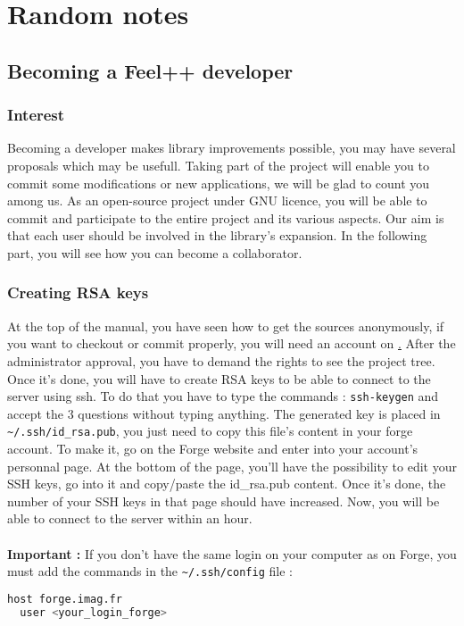 \chapter{Random notes}
\label{cha:random-notes}

\section{Becoming a Feel++ developer}
\label{feeldevel}
\subsection{Interest}
Becoming a \feel developer makes library improvements possible, you may have several proposals which may be usefull. Taking part of the project will enable you to commit some modifications or new applications, we will be glad to count you among us. As an open-source project under GNU licence,  you will be able to commit and participate to the entire project and its various aspects. Our aim is that each user should be involved in the library's expansion. In the following part, you will see how you can become a \feel collaborator.

\subsection{Creating RSA keys}
\label{sec:creation-rsa-keys}
At the top of the manual, you have seen how to get the sources anonymously, if you want to checkout or commit properly, you will need an account on \href{https://forge.imag.fr/}. After the administrator approval, you have to demand the rights to see the project tree. \newline \newline
Once it's done, you will have to create RSA keys to be able to connect to the server using ssh. To do that you have to type the commands : \verb|ssh-keygen| and accept the 3 questions without typing anything. The generated key is placed in \verb|~/.ssh/id_rsa.pub|, you just need to copy this file's content in your forge account. To make it, go on the Forge website and enter into your account's personnal page. At the bottom of the page, you'll have the possibility to edit your SSH keys, go into it and copy/paste the id\_rsa.pub content. Once it's done, the number of your SSH keys in that page should have increased. Now, you will be able to connect to the server within an hour.
\\ \\
{\bfseries Important : } If you don't have the same login on your computer as on
Forge, you must add the commands in the \verb|~/.ssh/config| file :
\begin{lstlisting}[language=sh]
host forge.imag.fr
  user <your_login_forge>
\end{lstlisting}



